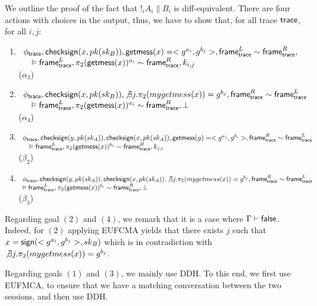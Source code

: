 We outline the proof of the fact that $!_i A_i \| B_i$ is diff-equivalent. There are four actions with choices in the output, thus, we have to show that, for all trace $\textsf{trace}$, for all $i,j$:
\begin{enumerate}
\item $\begin{array}[t]{l}
    \phi_{\textsf{trace}},  \textsf{checksign}(x,pk(sk_B)), \textsf{getmess}(x)=<g^{a_i}, g^{b_j}>, \textsf{frame}_{\textsf{trace}}^L \sim \textsf{frame}_{\textsf{trace}}^R,  \\
    \quad \vDash \textsf{frame}_{\textsf{trace}}^L, \pi_2(\textsf{getmess}(x))^{a_i} \sim \textsf{frame}_{\textsf{trace}}^R, k_{i,j}
  \end{array}
  $ ($\alpha_3$)

\item $\begin{array}[t]{l}
    \phi_{\textsf{trace}},  \textsf{checksign}(x,pk(sk_B)),  \not \exists j. \pi_2(mygetmess(x))= g^{b_j},  \textsf{frame}_{\textsf{trace}}^R \sim \textsf{frame}_{\textsf{trace}}^L \\
    \quad \vDash \textsf{frame}_{\textsf{trace}}^L, \pi_2(\textsf{getmess}(x))^{a_i} \sim \textsf{frame}_{\textsf{trace}}^R, \bot
  \end{array} $ ($\alpha_4$)
\item $\begin{array}[t]{l}
    \phi_{\textsf{trace}},  \textsf{checksign}(y,pk(sk_A)), \textsf{checksign}(x,pk(sk_A)), \textsf{getmess}(y)=<g^{a_j}, g^{b_i}>,  \textsf{frame}_{\textsf{trace}}^R \sim \textsf{frame}_{\textsf{trace}}^L \\ \quad \vDash \textsf{frame}_{\textsf{trace}}^L, \pi_2(\textsf{getmess}(x))^{b_i} \sim \textsf{frame}_{\textsf{trace}}^R, k_{j,i}
  \end{array}$ ($\beta_2$)
\item $\begin{array}[t]{l}
    \phi_{\textsf{trace}},  \textsf{checksign}(y,pk(sk_A)), \textsf{checksign}(x,pk(sk_A)),  \not \exists j. \pi_2(mygetmess(x))= g^{b_j},  \textsf{frame}_{\textsf{trace}}^R \sim \textsf{frame}_{\textsf{trace}}^L\\
    \vDash \textsf{frame}_{\textsf{trace}}^L, \pi_2(\textsf{getmess}(x))^{b_i} \sim \textsf{frame}_{\textsf{trace}}^R, \bot
  \end{array}$ ($\beta_3$)
\end{enumerate}

Regarding goal $(2)$ and $(4)$, we remark that it is a case where $\Gamma \vdash \textsf{false}$. Indeed, for $(2)$ applying EUFCMA yields that there exists $j$ such that $x = \textsf{sign}(<g^{a_i},g^{b_j}>,sk_B)$ which is in contradiction with  $\not \exists j. \pi_2(mygetmess(x))= g^{b_j}$.

Regarding goals $(1)$ and $(3)$, we mainly use DDH. To this end, we first use EUFMCA, to ensure that we have a matching conversation between the two sessions, and then use DDH. 




